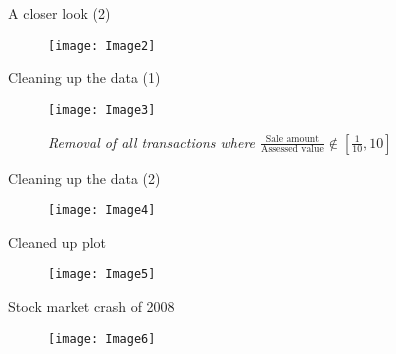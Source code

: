 \documentclass{beamer}
\begin{document}
	\begin{frame}{A closer look (2)}
		\begin{figure}[h]
			\centering
			\texttt{[image: Image2]}
		\end{figure}
	\end{frame}

	\begin{frame}{Cleaning up the data (1)}
		\begin{figure}[h]
			\centering
			\texttt{[image: Image3]}
			\caption{\textit{Removal of all transactions where $\frac{\text{Sale amount}}{\text{Assessed value}} \notin \left[  \frac{1}{10}, 10\right]$ }}
		\end{figure}
	\end{frame}

	\begin{frame}{Cleaning up the data (2)}
		\begin{figure}[h]
			\centering
			\texttt{[image: Image4]}
		\end{figure}
	\end{frame}

	\begin{frame}{Cleaned up plot}
		\begin{figure}[h]
			\centering
			\texttt{[image: Image5]}
		\end{figure}
	\end{frame}

	\begin{frame}{Stock market crash of 2008}
		\begin{figure}[h]
			\centering
			\texttt{[image: Image6]}
		\end{figure}
	\end{frame}
\end{document}
